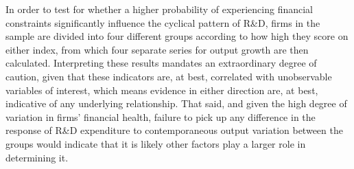 \documentclass{_latex/house}
\begin{document}
In order to test for whether a higher probability of experiencing financial constraints significantly influence the cyclical pattern of R\&D, firms in the sample are divided into four different groups according to how high they score on either index, from which four separate series for output growth are then calculated. Interpreting these results mandates an extraordinary degree of caution, given that these indicators are, at best, correlated with unobservable variables of interest, which means evidence in either direction are, at best, indicative of any underlying relationship. That said, and given the high degree of variation in firms' financial health, failure to pick up any difference in the response of R\&D expenditure to contemporaneous output variation between the groups would indicate that it is likely other factors play a larger role in determining it.
\end{document}
